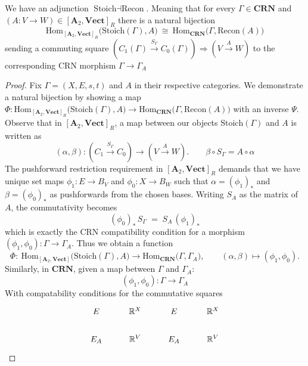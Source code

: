 \documentclass[11pt, one side, article]{memoir}
\begin{document}
\begin{proposition}
    We have an adjunction $\textrm{Stoich} \dashv \textrm{Recon}$. Meaning that for every $\Gamma \in \mathbf{CRN}$ and $(A:V\to W) \in [\mathbf{A}_2, \mathbf{Vect}]_R$ there is a natural bijection
    \[
     \mathrm{Hom}_{[\mathbf{A}_2,\mathbf{Vect}]_R}\!\big(\mathrm{Stoich}(\Gamma),A\big)\ \cong\
    \mathrm{Hom}_{\mathbf{CRN}}\!\big(\Gamma,\mathrm{Recon}(A)\big)
    \]
    sending a commuting square $(C_1(\Gamma)\!\xrightarrow{S_\Gamma}\!C_0(\Gamma))\Rightarrow (V\!\xrightarrow{A}\!W)$
    to the corresponding CRN morphism $\Gamma\to\Gamma_A$
\end{proposition}
\begin{proof}
    Fix $\Gamma = (X,E,s,t)$ and $A$ in their respective categories.
    We demonstrate a natural bijection by showing a map $\Phi:\mathrm{Hom}_{[\mathbf{A}_2,\mathbf{Vect}]_R}\!\big(\mathrm{Stoich}(\Gamma),A\big) \to \mathrm{Hom}_{\mathbf{CRN}}\!\big(\Gamma,\mathrm{Recon}(A)\big) $ 
    with an inverse $\Psi$.
    \newline Observe that in $[\mathbf{A}_2, \mathbf{Vect}]_R$, a map between our objects $\textrm{Stoich}(\Gamma)$ and $A$ is written as
    \[
    (\alpha,\beta):(C_1 \xrightarrow{S_\Gamma} C_0) \to (V \xrightarrow{A} W). \qquad  \beta \circ S_\Gamma = A \circ \alpha
    \]
    The pushforward restriction requirement in $[\mathbf{A}_2, \mathbf{Vect}]_R$ demands that we have unique set maps $\phi_1:E \to B_V$ and $\phi_0:X \to B_W$ such that $\alpha = (\phi_1)_*$ and $\beta = (\phi_0)_*$ as pushforwards from the chosen bases. Writing $S_A$ as the matrix of $A$, the commutativity becomes
    \[
    (\phi_0)_*\,S_\Gamma \;=\; S_A\,(\phi_1)_*
    \]
    which is exactly the CRN compatibility condition for a morphism
    $(\phi_1,\phi_0):\Gamma\to\Gamma_A$.
    Thus we obtain a function
    \[
    \Phi:\ \mathrm{Hom}_{[\mathbf{A}_2,\mathbf{Vect}]}\bigl(\mathrm{Stoich}(\Gamma),A\bigr)
    \longrightarrow
    \mathrm{Hom}_{\mathbf{CRN}}\bigl(\Gamma,\Gamma_A\bigr),
    \qquad
    (\alpha,\beta)\mapsto (\phi_1,\phi_0).
    \]
    Similarly, in $\mathbf{CRN}$, given a map between $\Gamma$ and $\Gamma_A$:
    \[
    (\phi_1,\phi_0): \Gamma \to \Gamma_A
    \]
    With compatability conditions for the commutative squares
    \begin{equation*}
        \begin{tikzcd}
    	E & {\mathbb{R}^X} & E & {\mathbb{R}^X} \\
    	{E_A} & {\mathbb{R}^{V}} & {E_A} & {\mathbb{R}^{V}}

\end{tikzcd}
\end{equation*}
\end{proof}
\end{document}
